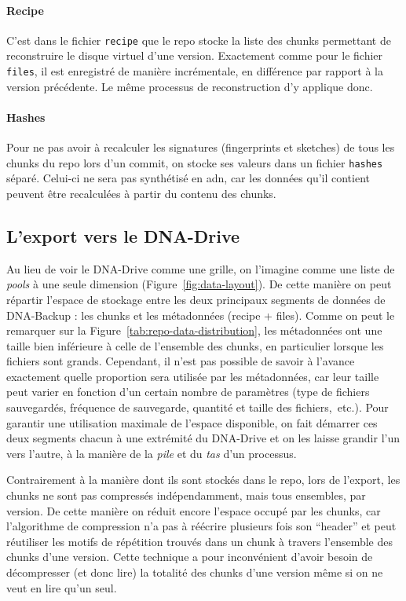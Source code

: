 \documentclass[a4paper]{report}
\begin{document}
\paragraph{Recipe}
C'est dans le fichier \verb|recipe| que le repo stocke la liste des chunks
permettant de reconstruire le disque virtuel d'une version.
Exactement comme pour le fichier \verb|files|, il est enregistré de manière incrémentale,
en différence par rapport à la version précédente.
Le même processus de reconstruction d'y applique donc.

\paragraph{Hashes}
Pour ne pas avoir à recalculer les signatures (fingerprints et sketches) de tous les chunks du repo lors d'un commit,
on stocke ses valeurs dans un fichier \verb|hashes| séparé.
Celui-ci ne sera pas synthétisé en \ac{adn},
car les données qu'il contient peuvent être recalculées à partir du contenu des chunks.


\subsection{L'export vers le DNA-Drive}
\label{sec:dna-export}

Au lieu de voir le DNA-Drive comme une grille,
on l'imagine comme une liste de \emph{pools} à une seule dimension (Figure~\ref{fig:data-layout}).
De cette manière on peut répartir l'espace de stockage
entre les deux principaux segments de données de DNA-Backup :
les chunks et les métadonnées (recipe + files).
Comme on peut le remarquer sur la Figure~\ref{tab:repo-data-distribution},
les métadonnées ont une taille bien inférieure à celle de l'ensemble des chunks,
en particulier lorsque les fichiers sont grands.
Cependant, il n'est pas possible de savoir à l'avance exactement
quelle proportion sera utilisée par les métadonnées,
car leur taille peut varier en fonction d'un certain nombre de paramètres
(type de fichiers sauvegardés, fréquence de sauvegarde, quantité et taille des fichiers,~etc.).
Pour garantir une utilisation maximale de l'espace disponible,
on fait démarrer ces deux segments chacun à une extrémité du DNA-Drive
et on les laisse grandir l'un vers l'autre,
à la manière de la \emph{pile} et du \emph{tas} d'un processus.

Contrairement à la manière dont ils sont stockés dans le repo,
lors de l'export, les chunks ne sont pas compressés indépendamment,
mais tous ensembles, par version.
De cette manière on réduit encore l'espace occupé par les chunks,
car l'algorithme de compression n'a pas à réécrire plusieurs fois son ``header''
et peut réutiliser les motifs de répétition trouvés dans un chunk
à travers l'ensemble des chunks d'une version.
Cette technique a pour inconvénient d'avoir besoin de décompresser (et donc lire)
la totalité des chunks d'une version même si on ne veut en lire qu'un seul.
\end{document}
